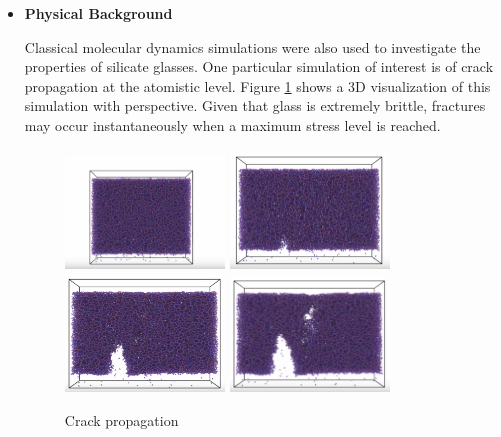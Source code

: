 \begin{itemize}
\item \textbf{Physical Background} 

Classical molecular dynamics simulations were also used to investigate the properties of silicate glasses. One particular simulation of interest is of crack propagation at the atomistic level. Figure \ref{crack_prop} shows a 3D visualization of this simulation with perspective. Given that glass is extremely brittle, fractures may occur instantaneously when a maximum stress level is reached.
\bigskip
\begin{figure}
    \centering
    \noindent
\includegraphics[width=0.4\textwidth]{picture/frac_prop1.PNG}\hspace{0.2\textwidth}%
\includegraphics[width=0.4\textwidth]{picture/frac_prop2.PNG}\\[2em]
\includegraphics[width=0.4\textwidth]{picture/frac_prop3.PNG}\hspace{0.2\textwidth}%
\includegraphics[width=0.4\textwidth]{picture/frac_prop4.PNG}\par
    \caption{Crack propagation}
    \label{crack_prop}
\end{figure}


\end{itemize}
